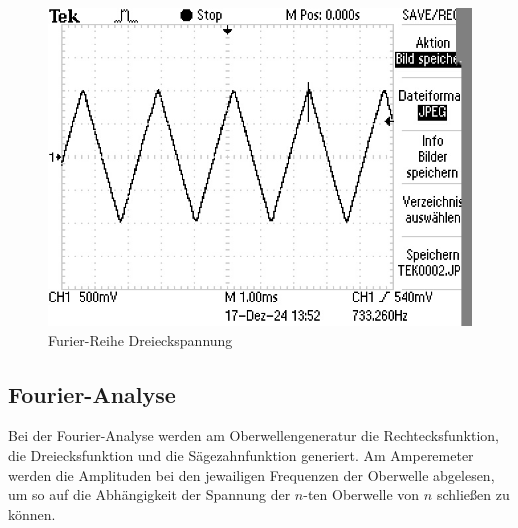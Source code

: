 \begin{figure}[H]
    \centering
    \caption{Furier-Reihe Dreieckspannung}
    \includegraphics{Bilder/TEK0002.JPG}
\end{figure}


\subsection{Fourier-Analyse}
Bei der Fourier-Analyse werden am Oberwellengeneratur die Rechtecksfunktion,
die Dreiecksfunktion und die Sägezahnfunktion generiert. Am Amperemeter werden 
die Amplituden bei den jewailigen Frequenzen der Oberwelle abgelesen, um so
auf die Abhängigkeit der Spannung der $n$-ten Oberwelle von $n$ schließen zu
können.
